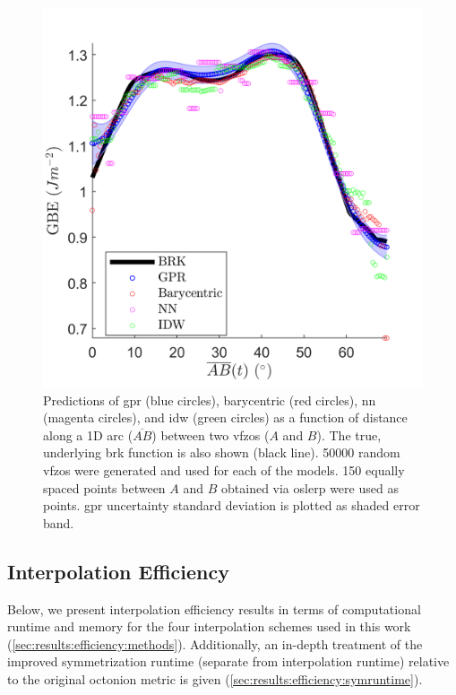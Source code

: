 \documentclass[final,twocolumn,12pt]{elsarticle}
\begin{document}
\begin{figure}[h!]
    \centering
    \includegraphics{figures/tunnel-50000.png}
    \caption{Predictions of \gls{gpr} (blue circles), barycentric (red circles), \gls{nn} (magenta circles), and \gls{idw} (green circles) as a function of distance along a 1D arc ($\overline{AB}$) between two \glspl{vfzo} ($A$ and $B$). The true, underlying \gls{brk} function is also shown (black line). \num{50000} random \inpt{} \glspl{vfzo} were generated and used for each of the models. \num{150} equally spaced points between $A$ and $B$ obtained via \gls{oslerp} \cite{francisGeodesicOctonionMetric2019} were used as \outpt{} points. \gls{gpr} uncertainty standard deviation is plotted as shaded error band.}
    \label{fig:tunnel-50000}
\end{figure}

\subsection{Interpolation Efficiency}
\label{sec:results:efficiency}

Below, we present interpolation efficiency results in terms of computational runtime and memory for the four interpolation schemes used in this work (\cref{sec:results:efficiency:methods}). Additionally, an in-depth treatment of the improved symmetrization runtime (separate from interpolation runtime) relative to the original octonion metric is given (\cref{sec:results:efficiency:symruntime}).
\end{document}
